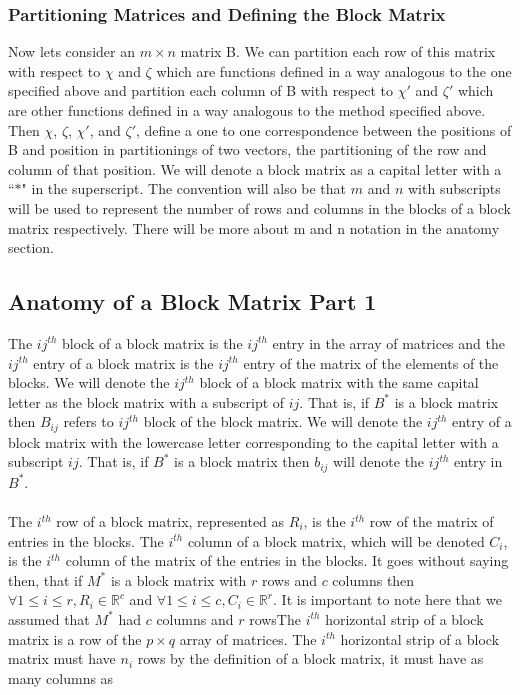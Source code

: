 \documentclass{article}
\begin{document}
\subsubsection{Partitioning Matrices and Defining the Block Matrix}
Now lets consider an $m \times n$ matrix B. We can partition each row of this matrix with respect to $\chi$ and $\zeta$ which are functions defined in a way analogous to the one specified above and partition each column of B with respect to $\chi'$ and $\zeta'$ which are other functions defined in a way analogous to the method specified above. Then $\chi$, $\zeta$, $\chi'$, and $\zeta'$, define a one to one correspondence between the positions of B and position in partitionings of two vectors, the partitioning of the row and column of that position. We will denote a block matrix as a capital letter with a ``$*$" in the superscript. The convention will also be that $m$ and $n$ with subscripts will be used to represent the number of rows and columns in the blocks of a block matrix respectively. There will be more about m and n notation in the anatomy section.
\subsection{Anatomy of a Block Matrix Part 1}
The $ij^{th}$ block of a block matrix is the $ij^{th}$ entry in the array of matrices and the $ij^{th}$ entry of a block matrix is the $ij^{th}$ entry of the matrix of the elements of the blocks. We will denote the $ij^{th}$ block of a block matrix with the same capital letter as the block matrix with a subscript of $ij$. That is, if $B^*$ is a block matrix then $B_{ij}$ refers to $ij^{th}$ block of the block matrix. We will denote the $ij^{th}$ entry of a block matrix with the lowercase letter corresponding to the capital letter with a subscript $ij$. That is, if $B^*$ is a block matrix then $b_{ij}$ will denote the $ij^{th}$ entry in $B^*$.\\\\
The $i^{th}$ row of a block matrix, represented as $R_i$, is the $i^{th}$ row of the matrix of entries in the blocks. The $i^{th}$ column of a block matrix, which will be denoted $C_i$, is the $i^{th}$ column of the matrix of the entries in the blocks. It goes without saying then, that if $M^*$ is a block matrix with $r$ rows and $c$ columns then $\forall 1 \leq i \leq r, R_i \in \mathbb{R}^c$ and $\forall 1 \leq i \leq c, C_i \in \mathbb{R}^r$. It is important to note here that we assumed that $M^*$ had $c$ columns and $r$ rowsThe $i^{th}$ horizontal strip of a block matrix is a row of the $p \times q$ array of matrices. The $i^{th}$ horizontal strip of a block matrix must have $n_i$ rows by the definition of a block matrix, it must have as many columns as 
\end{document}
